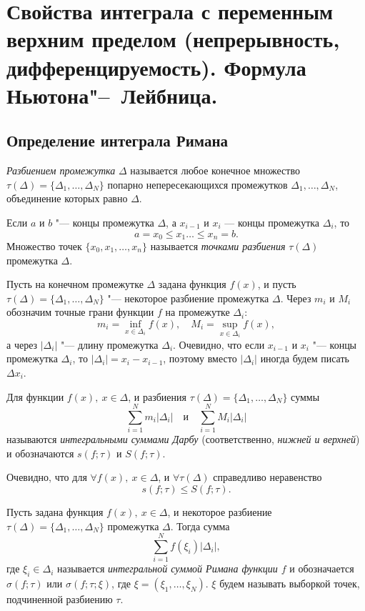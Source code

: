 \chapter[Свойства интеграла с переменным верхним пределом (непрерывность, дифференцируемость). Формула Ньютона"--~Лейбница.]{Свойства интеграла с переменным верхним пределом (непрерывность, дифференцируемость). Формула Ньютона"--~Лейбница.}
\section{Определение интеграла Римана}

\begin{defn}
\textit{Разбиением промежутка} $\Delta$ называется любое конечное множество $\tau(\Delta) = \{ \Delta_1, \ldots, \Delta_N\}$ попарно непересекающихся промежутков $\Delta_1, \ldots, \Delta_N$, объединение которых равно $\Delta$.

Если $a$ и $b$ "--- концы промежутка  $\Delta$, а $x_{i-1}$ и $x_{i}$ — концы промежутка $\Delta_i$, то
$$
a=x_0\le x_1\ldots \le x_n=b.
$$
Множество точек $\{x_0,x_1,\dots,x_n\}$ называется \textit{точками разбиения} $\tau(\Delta)$ промежутка $\Delta$.
\end{defn}

Пусть на конечном промежутке $\Delta$ задана функция $f(x)$, и пусть $\tau(\Delta) = \{ \Delta_1, \ldots, \Delta_N\}$ "--- некоторое разбиение промежутка $\Delta$. 
Через $m_i$ и $M_i$ обозначим точные грани функции $f$ на промежутке $\Delta_i$:
$$
m_i = \inf_{x \in \Delta_i} f(x), \quad M_i = \sup_{x \in \Delta_i} f(x),
$$ 
 а через $|\Delta_i|$ "--- длину промежутка $\Delta_i$. Очевидно, что если $x_{i-1}$ и $x_i$ "--- концы промежутка $\Delta_i$, то $|\Delta_i|=x_i-x_{i-1}$, поэтому вместо $|\Delta_i|$ иногда будем писать $\Delta x_i$. 

\begin{defn}
Для функции $f(x), \ x \in \Delta$, и разбиения $\tau(\Delta) = \{ \Delta_1, \ldots, \Delta_N\}$ суммы 
$$
\sum_{i = 1}^{N}m_i|\Delta_i| \quad \text{и} \quad \sum_{i = 1}^{N}M_i|\Delta_i|
$$
называются \textit{интегральными суммами Дарбу} (соответственно, \textit{нижней и верхней}) и обозначаются $s(f; \tau)$ и $S(f; \tau)$.
\end{defn}

Очевидно, что для $\forall f(x), \ x \in \Delta$, и $\forall \tau(\Delta)$ справедливо неравенство 
$$
s(f; \tau) \le S(f; \tau).
$$

\begin{defn}
Пусть задана функция $f(x), \ x \in \Delta$, и некоторое разбиение $\tau(\Delta) = \{ \Delta_1, \ldots, \Delta_N\}$ промежутка $\Delta$. Тогда сумма
$$
\sum_{i = 1}^{N} f(\xi_i)|\Delta_i|,
$$
где $\xi_i \in \Delta_i$ называется \textit{интегральной суммой Римана функции $f$} и обозначается $\sigma(f; \tau)$ или $\sigma(f; \tau; \xi)$, где $\xi = (\xi_1, \ldots, \xi_N)$. $\xi$ будем называть выборкой точек, подчиненной разбиению $\tau$.
\end{defn}

